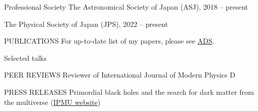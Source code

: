 \documentclass{resume} %
\begin{document}
\begin{rSection}{Professional Society}
    The Astronomical Society of Japan (ASJ), 2018 -- present

    The Physical Society of Japan (JPS), 2022 -- present
\end{rSection}

\clearpage
\begin{rSection}{PUBLICATIONS}
    For up-to-date list of my papers, please see \href{https://ui.adsabs.harvard.edu/search/filter_author_facet_hier_fq_author=AND&filter_author_facet_hier_fq_author=author_facet_hier%3A%221%2FSugiyama%2C%20S%2FSugiyama%2C%20Sunao%22&fq=%7B!type%3Daqp%20v%3D%24fq_author%7D&fq_author=(author_facet_hier%3A%221%2FSugiyama%2C%20S%2FSugiyama%2C%20Sunao%22)&q=pubdate%3A%5B2001-01%20TO%209999-12%5D%20author%3A(%22Sugiyama%2CSunao%22)&sort=date%20desc%2C%20bibcode%20desc&p_=0}{ADS}.
    \vspace{-19em}
    
    
\end{rSection}

\begin{rSection}{Selected talks}
    
\end{rSection}

\begin{rSection}{PEER REVIEWS}
    Reviewer of International Journal of Modern Physics D
\end{rSection}

\begin{rSection}{PRESS RELEASES}
    Primordial black holes and the search for dark matter from the multiverse (\href{https://www.ipmu.jp/en/20201224-PBH-multiverse}{IPMU website})
\end{rSection}
\end{document}
